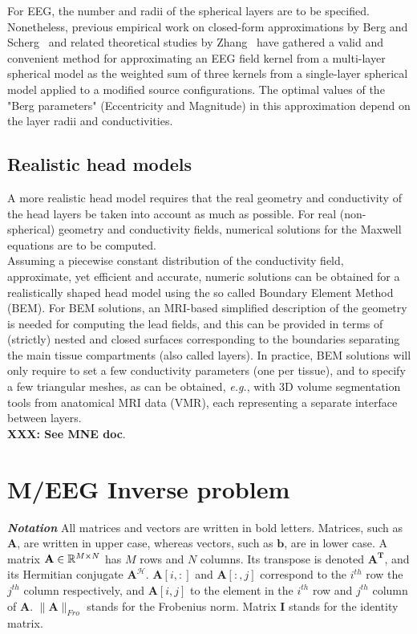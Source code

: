 For EEG, the number and radii of the spherical layers are to be specified. Nonetheless, previous empirical work on closed-form approximations by Berg and Scherg~\cite{berg1994fast} and related theoretical studies by Zhang~\cite{zhang1995fast} have gathered a valid and convenient method for approximating an EEG field kernel from a multi-layer spherical model as the weighted sum of three kernels from a single-layer spherical model applied to a modified source configurations. The optimal values of the "Berg parameters" (Eccentricity and Magnitude) in this approximation depend on the layer radii and conductivities.

\subsection*{Realistic head models}
A more realistic head model requires that the real geometry and conductivity of the head layers be taken into account as much as possible. For real (non-spherical) geometry and conductivity fields, numerical solutions for the Maxwell equations are to be computed.\\
Assuming a piecewise constant distribution of the conductivity field, approximate, yet efficient and accurate, numeric solutions can be obtained for a realistically shaped head model using the so called Boundary Element Method (BEM). For BEM solutions, an MRI-based simplified description of the geometry is needed for computing the lead fields, and this can be provided in terms of (strictly) nested and closed surfaces corresponding to the boundaries separating the main tissue compartments (also called layers).
In practice, BEM solutions will only require to set a few conductivity parameters (one per tissue), and to specify a few triangular meshes, as can be obtained, \textit{e.g.}, with 3D volume segmentation tools from anatomical MRI data (VMR), each representing a separate interface between layers. \\
\textbf{XXX: See MNE doc}.


\section{M/EEG Inverse problem}
\emph{\textbf{Notation}}
All matrices and vectors are written in bold letters. Matrices, such as $\mathbf{A}$, are written in upper case, whereas vectors, such as $\mathbf{b}$, are in lower case. A matrix $\mathbf{A} \in \mathbb{R}^{M\times N}$ has $M$ rows and $N$ columns. Its transpose is denoted $\mathbf{A}^\mathbf{T}$, and its Hermitian conjugate $\mathbf{A}^\mathcal{H}$. $\mathbf{A}[i,:]$ and $\mathbf{A}[:,j]$ correspond to the $i^{th}$ row the $j^{th}$ column respectively, and $\mathbf{A}[i,j]$ to the element in the $i^{th}$ row and $j^{th}$ column of $\mathbf{A}$.
$\|\mathbf{A}\|_{Fro}$ stands for the Frobenius norm. Matrix $\mathbf{I}$ stands for the identity matrix.

